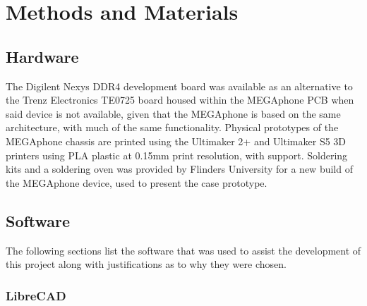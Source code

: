 
\chapter{Methods and Materials} %

\label{Chapter3} %



\section{Hardware}

The Digilent Nexys DDR4 development board was available as an alternative to the Trenz Electronics TE0725 board housed within the MEGAphone PCB when said device is not available, given that the MEGAphone is based on the same architecture, with much of the same functionality.
Physical prototypes of the MEGAphone chassis are printed using the Ultimaker 2+ and Ultimaker S5 3D printers using PLA plastic at 0.15mm print resolution, with support.
Soldering kits and a soldering oven was provided by Flinders University for a new build of the MEGAphone device, used to present the case prototype.


\section{Software}

The following sections list the software that was used to assist the development of this project along with justifications as to why they were chosen.


\subsection{LibreCAD}


